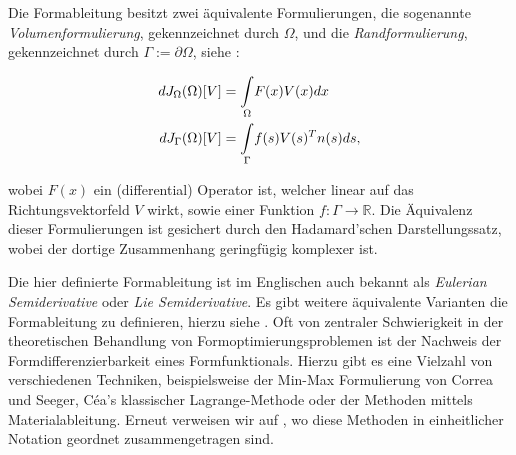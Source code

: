 Die Formableitung besitzt zwei äquivalente Formulierungen, die sogenannte \textit{Volumenformulierung}, gekennzeichnet durch $\Omega$, und die \textit{Randformulierung}, gekennzeichnet durch $\Gamma := \partial \Omega$, siehe \cite{bfgs2}:

\begin{align*}
	dJ_\Omega(\Omega)[V] &= \underset{\Omega}{\int}F(x)V(x)dx\\
	\vspace{0.5cm}
	dJ_\Gamma(\Omega)[V] &= \underset{\Gamma}{\int}f(s)V(s)^Tn(s)ds,
\end{align*}

wobei $F(x)$ ein (differential) Operator ist, welcher linear auf das Richtungsvektorfeld $V$ wirkt, sowie einer Funktion $f: \Gamma \rightarrow \mathbb{R}$. Die Äquivalenz dieser Formulierungen ist gesichert durch den Hadamard'schen Darstellungssatz, wobei der dortige Zusammenhang geringfügig komplexer ist.

Die hier definierte Formableitung ist im Englischen auch bekannt als \textit{Eulerian Semiderivative} oder \textit{Lie Semiderivative}. Es gibt weitere äquivalente Varianten die Formableitung zu definieren, hierzu siehe \cite{Shape_diff}. Oft von zentraler Schwierigkeit in der theoretischen Behandlung von Formoptimierungsproblemen ist der Nachweis der Formdifferenzierbarkeit eines Formfunktionals. Hierzu gibt es eine Vielzahl von verschiedenen Techniken, beispielsweise der Min-Max Formulierung von Correa und Seeger, Céa's klassischer Lagrange-Methode oder der Methoden mittels Materialableitung. Erneut verweisen wir auf \cite{Shape_diff}, wo diese Methoden in einheitlicher Notation geordnet zusammengetragen sind.